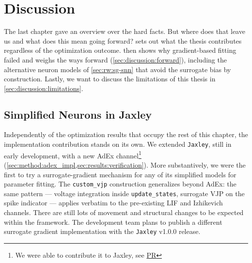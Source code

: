 \section{Discussion}\label{ch:discussion}

The last chapter gave an overview over the hard facts.
But where does that leave us and what does this mean going forward?
 sets out what the thesis contributes regardless of the optimization outcome.
 then shows why gradient-based fitting failed and weighs the ways forward (\cref{sec:discussion:forward}), including the alternative neuron models of \cref{sec:rw:sg-snn} that avoid the surrogate bias by construction.
Lastly, we want to discuss the limitations of this thesis in \cref{sec:discussion:limitations}.

\subsection{Simplified Neurons in Jaxley}\label{sec:discussion:jaxley}

Independently of the optimization results that occupy the rest of this chapter, the implementation contribution stands on its own.
We extended \texttt{Jaxley}, still in early development, with a new \gls{AdEx} channel\footnote{We were able to contribute it to Jaxley, see \href{https://github.com/jaxleyverse/jaxley/pull/780}{PR}} (\cref{sec:method:adex_impl,sec:results:verification}).
More substantively, we were the first to try a surrogate-gradient mechanism for any of its simplified models for parameter fitting.
The \texttt{custom\_vjp} construction generalizes beyond \gls{AdEx}: the same pattern --- voltage integration inside \texttt{update\_states}, surrogate \gls{VJP} on the spike indicator --- applies verbatim to the pre-existing \gls{LIF} and Izhikevich channels.
There are still lots of movement and structural changes to be expected within the framework.
The development team plans to publish a different surrogate gradient implementation with the \texttt{Jaxley} v1.0.0 release.

